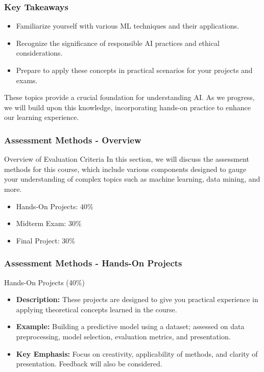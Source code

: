 \documentclass[aspectratio=169]{beamer}
\begin{document}
\begin{frame}[fragile]
    \frametitle{Key Takeaways}
    \begin{itemize}
        \item Familiarize yourself with various ML techniques and their applications.
        \item Recognize the significance of responsible AI practices and ethical considerations.
        \item Prepare to apply these concepts in practical scenarios for your projects and exams.
    \end{itemize}

    \vspace{1em}
    
    These topics provide a crucial foundation for understanding AI. As we progress, we will build upon this knowledge, incorporating hands-on practice to enhance our learning experience.
\end{frame}

\begin{frame}[fragile]
    \frametitle{Assessment Methods - Overview}
    \begin{block}{Overview of Evaluation Criteria}
        In this section, we will discuss the assessment methods for this course, which include various components designed to gauge your understanding of complex topics such as machine learning, data mining, and more.
    \end{block}
    \begin{itemize}
        \item Hands-On Projects: 40\%
        \item Midterm Exam: 30\%
        \item Final Project: 30\%
    \end{itemize}
\end{frame}

\begin{frame}[fragile]
    \frametitle{Assessment Methods - Hands-On Projects}
    \begin{block}{Hands-On Projects (40\%)}
        \begin{itemize}
            \item \textbf{Description:} These projects are designed to give you practical experience in applying theoretical concepts learned in the course.
            \item \textbf{Example:} Building a predictive model using a dataset; assessed on data preprocessing, model selection, evaluation metrics, and presentation.
            \item \textbf{Key Emphasis:} Focus on creativity, applicability of methods, and clarity of presentation. Feedback will also be considered.
        \end{itemize}
    \end{block}
\end{frame}
\end{document}
